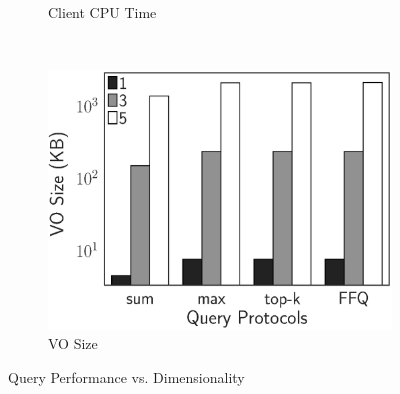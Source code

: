 \begin{figure}[t]
\begin{subfigure}[b]{.33\linewidth}
    \caption{Client CPU Time}
  \end{subfigure}~%
  \begin{subfigure}[b]{.33\linewidth}
    \centering
    \includegraphics[height=\ht\figbox]{exp-figs/aggregate-queries/dimension_vo.eps}
    \caption{VO Size}
  \end{subfigure}
  \caption{Query Performance vs. Dimensionality}\label{fig:aggregate-queries:md}


\end{figure}
